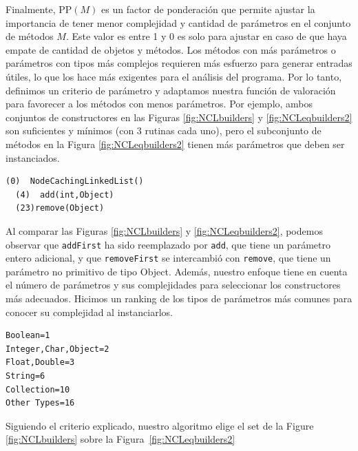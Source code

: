 Finalmente, $\text{{PP}}(M)$ es un factor de ponderación que permite ajustar la importancia de tener menor complejidad y cantidad de parámetros en el conjunto de métodos $M$. Este valor es entre 1 y 0 es solo para ajustar en caso de que haya empate de cantidad de objetos y métodos.
Los métodos con más parámetros o parámetros con tipos más complejos requieren más esfuerzo para generar entradas útiles, lo que los hace más exigentes para el análisis del programa. Por lo tanto, definimos un criterio de parámetro y adaptamos nuestra función de valoración para favorecer a los métodos con menos parámetros. Por ejemplo, ambos conjuntos de constructores en las Figuras \ref{fig:NCLbuilders} y \ref{fig:NCLeqbuilders2} son suficientes y mínimos (con 3 rutinas cada uno), pero el subconjunto de métodos en la Figura \ref{fig:NCLeqbuilders2} tienen más parámetros que deben ser instanciados. 

\begin{lstlisting}[label=fig:NCLeqbuilders2, caption=Sufficient and minimal builders for NCL with more complex parameters than the ones in Figure \ref{fig:NCLbuilders}, captionpos=b, frame=tb, float=t]
  (0)  NodeCachingLinkedList()
  (4)  add(int,Object)
  (23)remove(Object)
\end{lstlisting}

Al comparar las Figuras \ref{fig:NCLbuilders} y \ref{fig:NCLeqbuilders2}, podemos observar que \texttt{addFirst} ha sido reemplazado por \texttt{add}, que tiene un parámetro entero adicional, y que \texttt{removeFirst} se intercambió con \texttt{remove}, que tiene un parámetro no primitivo de tipo Object. Además, nuestro enfoque tiene en cuenta el número de parámetros y sus complejidades para seleccionar los constructores más adecuados. Hicimos un ranking de los tipos de parámetros más comunes para conocer su complejidad al instanciarlos.

\begin{lstlisting}[label=fig:rankParameters, caption=Ranking con los tipos de parametros, captionpos=b, frame=tb, float=t]
Boolean=1
Integer,Char,Object=2
Float,Double=3
String=6
Collection=10
Other Types=16
\end{lstlisting}

Siguiendo el criterio explicado, nuestro algoritmo elige el set de la Figure \ref{fig:NCLbuilders} sobre la Figura~\ref{fig:NCLeqbuilders2}



